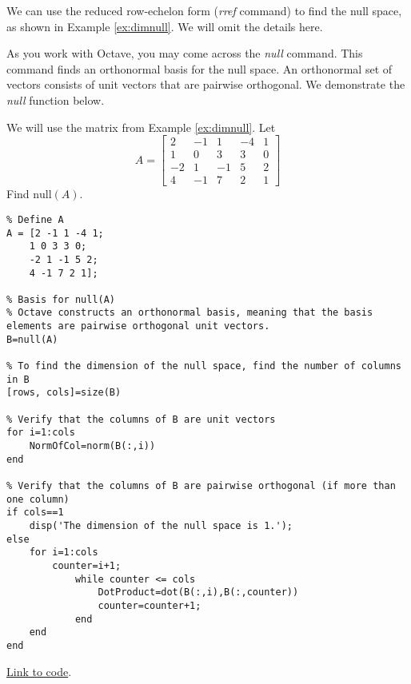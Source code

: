 \documentclass{ximera}
\begin{document}
We can use the reduced row-echelon form (\emph{rref} command) to find the null space, as shown in Example \ref{ex:dimnull}.  We will omit the details here.

As you work with Octave, you may come across the \emph{null} command.  This command finds an orthonormal basis for the null space.  An orthonormal set of vectors consists of unit vectors that are pairwise orthogonal.  We demonstrate the \emph{null} function below.

\begin{template}\label{temp:nullSpace}
    We will use the matrix from Example \ref{ex:dimnull}.  Let 
$$A=\begin{bmatrix}2&-1&1&-4&1\\1&0&3&3&0\\-2&1&-1&5&2\\4&-1&7&2&1\end{bmatrix}$$
Find $\mbox{null}(A)$.

\begin{verbatim}
% Define A
A = [2 -1 1 -4 1;
    1 0 3 3 0;
    -2 1 -1 5 2;
    4 -1 7 2 1];

% Basis for null(A)
% Octave constructs an orthonormal basis, meaning that the basis elements are pairwise orthogonal unit vectors.
B=null(A)

% To find the dimension of the null space, find the number of columns in B
[rows, cols]=size(B)

% Verify that the columns of B are unit vectors
for i=1:cols
    NormOfCol=norm(B(:,i))
end    

% Verify that the columns of B are pairwise orthogonal (if more than one column)
if cols==1
    disp('The dimension of the null space is 1.');
else    
    for i=1:cols
        counter=i+1;
            while counter <= cols
                DotProduct=dot(B(:,i),B(:,counter))
                counter=counter+1;
            end
    end
end  

\end{verbatim}

\href{https://sagecell.sagemath.org/?z=eJyNUstO5DAQvEfKP9QFkdHOIDLLaiXAhwmcFw5oL4hDSDpMS4l7ZDuM2K-nnQdvoe1Idlx2dXWXfYBLatgSNmmygcHtGqscOVYnyM_SBBo5jvFTv-NpvVrH_Ry_sJ6Qk7j8DcXvFEmTAxSlZ49GHGzfttlmEcGrKpSPhEqsD66vgkdpIS5sxYrryhb3kbVER6Vl-4CwLYMONOKgljqykeUIu5Ldnj2N_AexSu8tBzxSFcT5ozQpzIt2VL8RaKP1kLBmzeRZVL4ZgHgSfldWtHw9Zfvunlw8Uknbd9aDLYo0uXWy1zIV9HfG8z_KiknjLzlunl4Ln3maohjKfltimkR_2OSnMdPo5B814qq5kNZES7IiO13yQpOTlqTxnypfmZNxg050U2natp1pmpyHBr0x-VhEzX6XHd587xP0RvKjw4VeOLUqNVQXx89Nxaikt4Gc4R_zs5pjv-WW5n2cG7wnznEp4dpJrc_G1BImZ5ZxmqjRpo-kWXWaP2mrrSMw_OjwDIwb4og=&lang=octave&interacts=eJyLjgUAARUAuQ==}{Link to code}.
\end{template}
\end{document}
